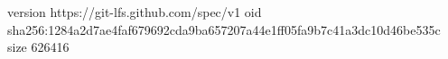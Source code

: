 version https://git-lfs.github.com/spec/v1
oid sha256:1284a2d7ae4faf679692cda9ba657207a44e1ff05fa9b7c41a3dc10d46be535c
size 626416
